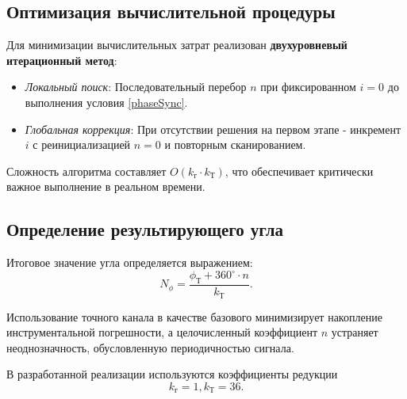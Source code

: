 \subsection{Оптимизация вычислительной процедуры}
Для минимизации вычислительных затрат реализован \textbf{двухуровневый итерационный метод}:
\begin{itemize}
    \item \textit{Локальный поиск}: Последовательный перебор $n$ при фиксированном \newline $i=0$ до выполнения условия \ref{phaseSync}. 
    \item \textit{Глобальная коррекция}: При отсутствии решения на первом этапе - инкремент $i$ с реинициализацией $n=0$ и повторным сканированием.
\end{itemize}
Сложность алгоритма составляет $O(k_{\text{г}} \cdot k_{\text{Т}})$, что обеспечивает критически важное выполнение в реальном времени.

\subsection{Определение результирующего угла}
Итоговое значение угла определяется выражением:
\begin{equation}
    N_{\phi} = \frac{\phi_{\text{Т}} + 360^{\circ} \cdot n}{k_{\text{Т}}}.
\end{equation}


 Использование точного канала в качестве базового минимизирует накопление инструментальной погрешности, 
а целочисленный коэффициент $n$ устраняет неоднозначность, обусловленную периодичностью сигнала.

В разработанной реализации используются коэффициенты редукции 
\begin{equation} k_{\text{г}} = 1, k_{\text{Т}} = 36. \end{equation}

